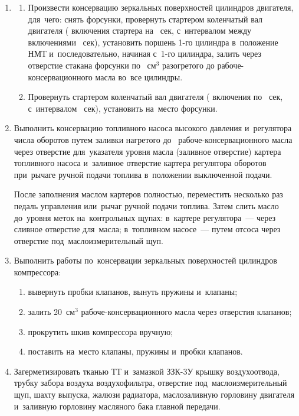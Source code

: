 \begin{enumerate}
    \item \begin{enumerate}
        \item Произвести консервацию зеркальных поверхностей цилиндров двигателя, для~чего: снять форсунки, провернуть стартером коленчатый вал двигателя ( включения стартера на ~сек, с~интервалом между включениями ~сек), установить поршень 1-го цилиндра в~положение НМТ и~последовательно, начиная с~1-го цилиндра, залить через отверстие стакана форсунки по ~см$^3$ разогретого до \celc{} рабоче-консервационного масла во~все цилиндры. 
        
        
        \item Провернуть стартером коленчатый вал двигателя ( включения по ~сек, с~интервалом ~сек), установить на~место форсунки. 
    \end{enumerate}

    \item Выполнить консервацию топливного насоса высокого давления и~регулятора числа оборотов путем заливки нагретого до~\celc{} рабоче-консервационного масла через отверстие для~указателя уровня масла (заливное отверстие) картера топливного насоса и~заливное отверстие картера регулятора оборотов при~рычаге ручной подачи топлива в~положении выключенной подачи. 
        
        После заполнения маслом картеров полностью, переместить несколько раз педаль управления или~рычаг ручной подачи топлива. Затем слить масло до~уровня меток на~контрольных щупах: в~картере регулятора~--- через сливное отверстие для~масла; в~топливном насосе~--- путем отсоса через отверстие под~маслоизмерительный щуп. 

    \item Выполнить работы по~консервации зеркальных поверхностей цилиндров компрессора: 
        \begin{enumerate}
            \item вывернуть пробки клапанов, вынуть пружины и~клапаны; 
            \item залить 20~см$^3$ рабоче-консервационного масла через отверстия клапанов;
            \item прокрутить шкив компрессора вручную;
            \item поставить на~место клапаны, пружины и~пробки клапанов. 
        \end{enumerate}
    \item Загерметизировать тканью ТТ и~замазкой ЗЗК-3У крышку воздухоотвода, трубку забора воздуха воздухофильтра, отверстие под~маслоизмерительный щуп, шахту выпуска, жалюзи радиатора, маслозаливную горловину двигателя и~заливную горловину масляного бака главной передачи. 


\end{enumerate}
